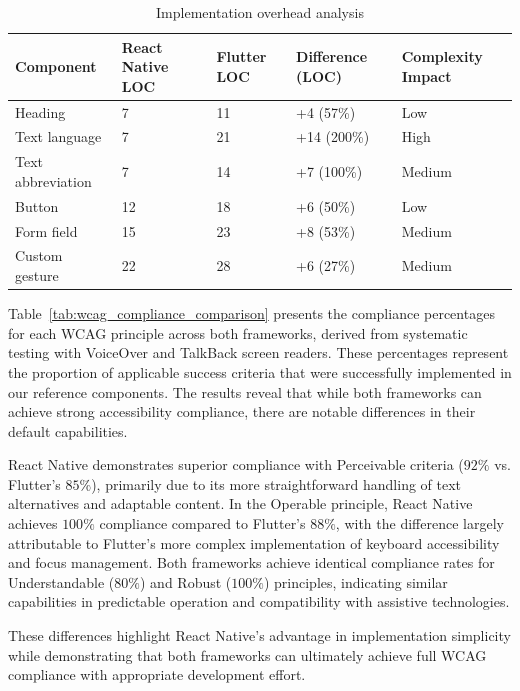 \begin{table}[ht]
\caption{Implementation overhead analysis}
\label{tab:implementation_overhead_comparison}
\centering
\begin{tabular}{|C{2.5cm}|C{2.5cm}|C{2.5cm}|C{2.5cm}|C{2.5cm}|}
\hline
\textbf{Component} & \textbf{React Native LOC} & \textbf{Flutter LOC} & \textbf{Difference (LOC)} & \textbf{Complexity Impact} \\
\hline
Heading & 7 & 11 & +4 (57\%) & Low \\
\hline
Text language & 7 & 21 & +14 (200\%) & High \\
\hline
Text abbreviation & 7 & 14 & +7 (100\%) & Medium \\
\hline
Button & 12 & 18 & +6 (50\%) & Low \\
\hline
Form field & 15 & 23 & +8 (53\%) & Medium \\
\hline
Custom gesture & 22 & 28 & +6 (27\%) & Medium \\
\hline
\end{tabular}
\end{table}

Table~\ref{tab:wcag_compliance_comparison} presents the compliance percentages for each WCAG principle across both frameworks, derived from systematic testing with VoiceOver and TalkBack screen readers. These percentages represent the proportion of applicable success criteria that were successfully implemented in our reference components. The results reveal that while both frameworks can achieve strong accessibility compliance, there are notable differences in their default capabilities.

React Native demonstrates superior compliance with Perceivable criteria ($92\%$ vs. Flutter's $85\%$), primarily due to its more straightforward handling of text alternatives and adaptable content. In the Operable principle, React Native achieves $100\%$ compliance compared to Flutter's $88\%$, with the difference largely attributable to Flutter's more complex implementation of keyboard accessibility and focus management. Both frameworks achieve identical compliance rates for Understandable ($80\%$) and Robust ($100\%$) principles, indicating similar capabilities in predictable operation and compatibility with assistive technologies.

These differences highlight React Native's advantage in implementation simplicity while demonstrating that both frameworks can ultimately achieve full WCAG compliance with appropriate development effort.


